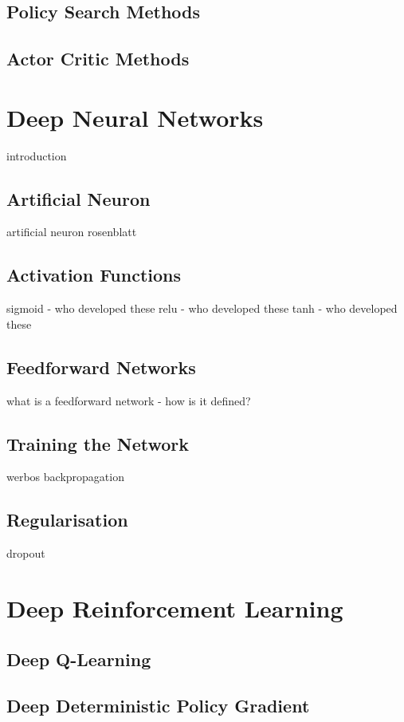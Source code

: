 \subsection{Policy Search Methods}

\subsection{Actor Critic Methods}


\section{Deep Neural Networks}\label{dnn}
introduction

\subsection{Artificial Neuron}
artificial neuron rosenblatt

\subsection{Activation Functions}
sigmoid - who developed these
relu - who developed these
tanh - who developed these

\subsection{Feedforward Networks}
what is a feedforward network - how is it defined?

\subsection{Training the Network}
werbos backpropagation

\subsection{Regularisation}
dropout

\section{Deep Reinforcement Learning}\label{drl}

\subsection{Deep Q-Learning}

\subsection{Deep Deterministic Policy Gradient}

